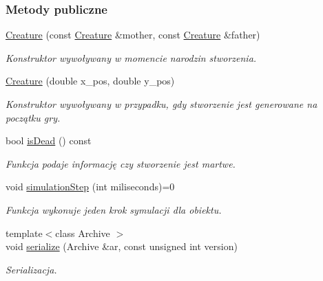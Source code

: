 \subsubsection*{Metody publiczne}
\begin{DoxyCompactItemize}
\item 
\hyperlink{classCreature_a85b135bb56773ebd20a30e7efc216a47}{Creature} (const \hyperlink{classCreature}{Creature} \&mother, const \hyperlink{classCreature}{Creature} \&father)
\begin{DoxyCompactList}\small\item\em Konstruktor wywoływany w momencie narodzin stworzenia. \end{DoxyCompactList}\item 
\hyperlink{classCreature_ab7aded4b4eee101b224e50985ca6d08d}{Creature} (double x\-\_\-pos, double y\-\_\-pos)
\begin{DoxyCompactList}\small\item\em Konstruktor wywoływany w przypadku, gdy stworzenie jest generowane na początku gry. \end{DoxyCompactList}\item 
bool \hyperlink{classCreature_ab4019c0b7940cd1b9fb19bf3399348ce}{is\-Dead} () const 
\begin{DoxyCompactList}\small\item\em Funkcja podaje informację czy stworzenie jest martwe. \end{DoxyCompactList}\item 
void \hyperlink{classCreature_af31d92f059f848284d371d3232384538}{simulation\-Step} (int miliseconds)=0
\begin{DoxyCompactList}\small\item\em Funkcja wykonuje jeden krok symulacji dla obiektu. \end{DoxyCompactList}\item 
{\footnotesize template$<$class Archive $>$ }\\void \hyperlink{classCreature_a03b0a51a8c6421046ce9ed004526566b}{serialize} (Archive \&ar, const unsigned int version)
\begin{DoxyCompactList}\small\item\em Serializacja. \end{DoxyCompactList}\end{DoxyCompactItemize}
